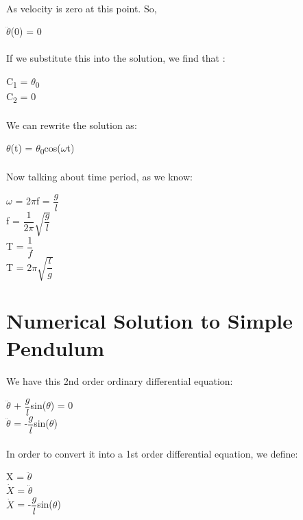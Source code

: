 \documentclass{article}
\begin{document}
\paragraph{}As velocity is zero at this point. So,
\begin{center}
$\ddot{\theta}$(0) = 0  
\end{center}
\paragraph{}If we substitute this into the solution, we find that :
\begin{center}
C\textsubscript{1} =  $\theta$\textsubscript{0}
\\C\textsubscript{2} = 0
\end{center}
\paragraph{}We can rewrite the solution as:
\begin{center}
$\theta$(t) = $\theta$\textsubscript{0}cos($\omega$t)
\end{center}
\paragraph{}Now talking about time period, as we know:
\begin{center}
$\omega$ = 2$\pi$f = $\dfrac{g}{l}$
\\ f = $\dfrac{1}{2\pi}\sqrt{\dfrac{g}{l}}$
\\ T = $\dfrac{1}{f}$
\\ T = 2$\pi\sqrt{\dfrac{l}{g}}$
\end{center}

\section{Numerical Solution to Simple Pendulum}
\paragraph{}We have this 2nd order ordinary differential equation:
\begin{center}
$\ddot{\theta}$ + $\dfrac{g}{l}$sin($\theta$) = 0
\\$\ddot{\theta}$ = -$\dfrac{g}{l}$sin($\theta$)
\end{center}
\paragraph{}In order to convert it into a 1st order differential equation, we define:
\begin{center}
X = $\ddot{\theta}$
\\ $\dot{X}$ = $\ddot{\theta}$
\\ $\dot{X}$ = -$\dfrac{g}{l}$sin($\theta$)
\end{center}
\end{document}
